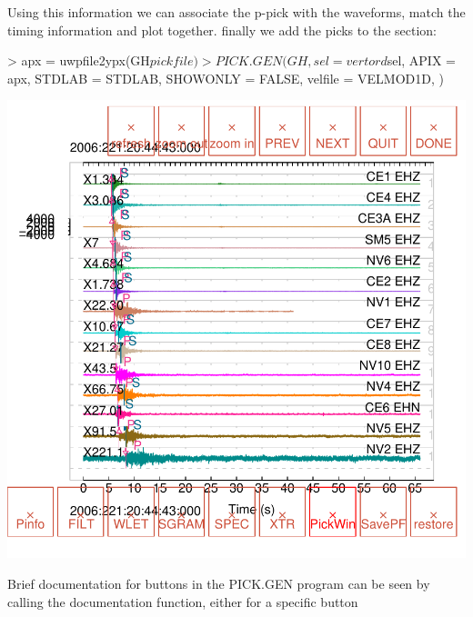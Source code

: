 \documentclass{article}
\begin{document}
Using this information we can associate the 
p-pick with the waveforms, match the timing information
and plot together.
finally we add the picks to the section:
\begin{Schunk}
\begin{Sinput}
> apx = uwpfile2ypx(GH$pickfile)
> PICK.GEN(GH, sel = vertord$sel, APIX = apx, STDLAB = STDLAB, 
     SHOWONLY = FALSE, velfile = VELMOD1D, )
\end{Sinput}
\end{Schunk}
\includegraphics{rseis-012}

Brief documentation for buttons in the PICK.GEN
program can be seen by calling the documentation function,
either for a specific button 
\end{document}
